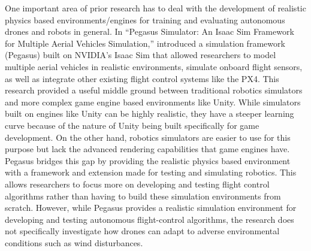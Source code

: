 \documentclass[12pt,letterpaper]{article}
\begin{document}
One important area of prior research has to deal with the development of realistic physics based environments/engines for training and evaluating autonomous drones and robots in general. In “Pegasus Simulator: An Isaac Sim Framework for Multiple Aerial Vehicles Simulation,” \cite{jacinto2024pegasus} introduced a simulation framework (Pegasus) built on NVIDIA’s Isaac Sim that allowed researchers to model multiple aerial vehicles in realistic environments, simulate onboard flight sensors, as well as integrate other existing flight control systems like the PX4. This research provided a useful middle ground between traditional robotics simulators and more complex game engine based environments like Unity. While simulators built on engines like Unity can be highly realistic, they have a steeper learning curve because of the nature of Unity being built specifically for game development. On the other hand, robotics simulators are easier to use for this purpose but lack the advanced rendering capabilities that game engines have. Pegasus bridges this gap by providing the realistic physics based environment with a framework and extension made for testing and simulating robotics. This allows researchers to focus more on developing and testing flight control algorithms rather than having to build these simulation environments from scratch. However, while Pegasus provides a realistic simulation environment for developing and testing autonomous flight-control algorithms, the research does not specifically investigate how drones can adapt to adverse environmental conditions such as wind disturbances.
\end{document}
